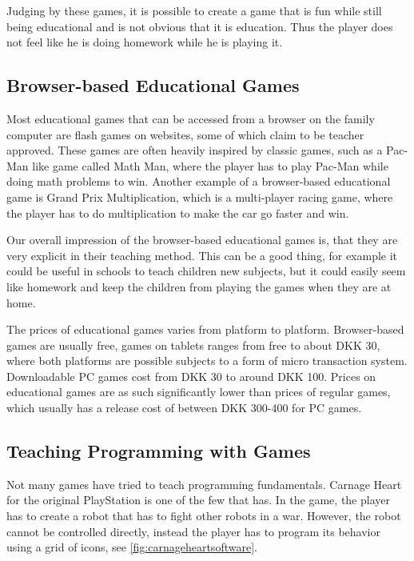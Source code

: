 Judging by these games, it is possible to create a game that is fun while still being educational and is not obvious that it is education. Thus the player does not feel like he is doing homework while he is playing it.

\subsection{Browser-based Educational Games}
Most educational games that can be accessed from a browser on the family computer are flash games on websites, some of which claim to be teacher approved.
These games are often heavily inspired by classic games, such as a Pac-Man like game called Math Man, where the player has to play Pac-Man while doing math problems to win.\cite{mathman} Another example of a browser-based educational game is Grand Prix Multiplication, which is a multi-player racing game, where the player has to do multiplication to make the car go faster and win.\cite{grandprix}\newline

Our overall impression of the browser-based educational games is, that they are very explicit in their teaching method.
This can be a good thing, for example it could be useful in schools to teach children new subjects, but it could easily seem like homework and keep the children from playing the games when they are at home.\newline

The prices of educational games varies from platform to platform. 
Browser-based games are usually free, games on tablets ranges from free to about DKK 30, where both platforms are possible subjects to a form of micro transaction system.
Downloadable PC games cost from DKK 30 to around DKK 100.
Prices on educational games are as such significantly lower than prices of regular games, which usually has a release cost of between DKK 300-400 for PC games.

\subsection{Teaching Programming with Games}
Not many games have tried to teach programming fundamentals. Carnage Heart for the original PlayStation is one of the few that has. In the game, the player has to create a robot that has to fight other robots in a war. However, the robot cannot be controlled directly, instead the player has to program its behavior using a grid of icons, see \ref{fig:carnageheartsoftware}.

